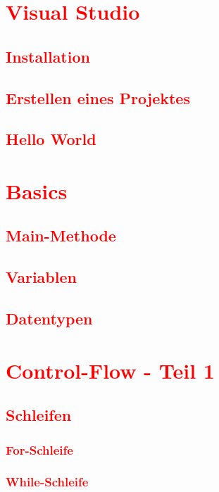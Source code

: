 \cleardoublepage\chapter{\textcolor{red}{Visual Studio}}\label{chap:visual-studio}
\section{\textcolor{red}{Installation}}\label{sec:installation}
\section{\textcolor{red}{Erstellen eines Projektes}}\label{sec:create-project}
\section{\textcolor{red}{Hello World}}\label{sec:hello-world}

\cleardoublepage\chapter{\textcolor{red}{Basics}}\label{chap:basics}
\section{\textcolor{red}{Main-Methode}}\label{sec:main-method}
\section{\textcolor{red}{Variablen}}\label{sec:variables}
\section{\textcolor{red}{Datentypen}}\label{sec:datatypes}

\cleardoublepage\chapter{\textcolor{red}{Control-Flow - Teil 1}}\label{chap:control-flow-1}
\section{\textcolor{red}{Schleifen}}\label{sec:loops}
\subsection{\textcolor{red}{For-Schleife}}\label{sec:for-loop}
\subsection{\textcolor{red}{While-Schleife}}\label{sec:while-loop}
